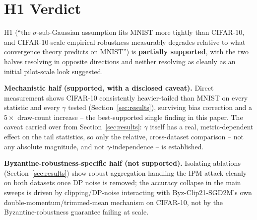 \documentclass{article}
\begin{document}
\section{H1 Verdict}
\label{sec:h1verdict}
H1 (``the $\sigma$-sub-Gaussian assumption fits MNIST more tightly than
CIFAR-10, and CIFAR-10-scale empirical robustness measurably degrades relative
to what convergence theory predicts on MNIST'') is \textbf{partially
supported}, with the two halves resolving in opposite directions and neither
resolving as cleanly as an initial pilot-scale look suggested.

\textbf{Mechanistic half (supported, with a disclosed caveat).} Direct
measurement shows CIFAR-10 consistently heavier-tailed than MNIST on every
statistic and every $\gamma$ tested (Section~\ref{sec:results}), surviving
bias correction and a $5\times$ draw-count increase -- the best-supported
single finding in this paper. The caveat carried over from
Section~\ref{sec:results}: $\gamma$ itself has a real, metric-dependent effect
on the tail statistics, so only the relative, cross-dataset comparison -- not
any absolute magnitude, and not $\gamma$-independence -- is established.

\textbf{Byzantine-robustness-specific half (not supported).} Isolating
ablations (Section~\ref{sec:results}) show robust aggregation handling the
IPM attack cleanly on both datasets once DP noise is removed; the accuracy
collapse in the main sweeps is driven by clipping/DP-noise interacting with
Byz-Clip21-SGD2M's own double-momentum/trimmed-mean mechanism on CIFAR-10,
not by the Byzantine-robustness guarantee failing at scale.
\end{document}
